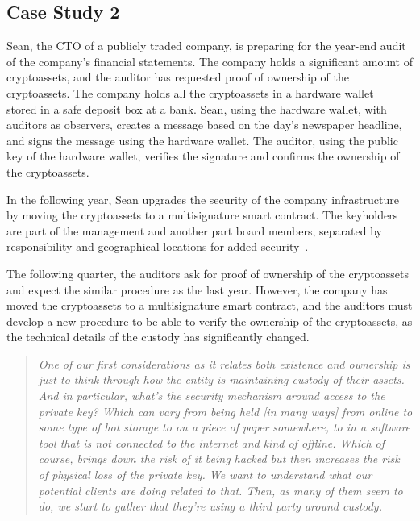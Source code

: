 \subsection{Case Study 2} \label{sec:auditing:case-studies:ownership} %
Sean, the CTO of a publicly traded company, is preparing for the year-end audit of the company's financial statements. The company holds a significant amount of cryptoassets, and the auditor has requested proof of ownership of the cryptoassets. The company holds all the cryptoassets in a hardware wallet~\cite{EBSC15} stored in a safe deposit box at a bank. Sean, using the hardware wallet, with auditors as observers, creates a message based on the day's newspaper headline, and signs the message using the hardware wallet. The auditor, using the public key of the hardware wallet, verifies the signature and confirms the ownership of the cryptoassets.

In the following year, Sean upgrades the security of the company infrastructure by moving the cryptoassets to a multisignature smart contract. The keyholders are part of the management and another part board members, separated by responsibility and geographical locations for added security~\cite{c4ccssa}. 

The following quarter, the auditors ask for proof of ownership of the cryptoassets and expect the similar procedure as the last year. However, the company has moved the cryptoassets to a multisignature smart contract, and the auditors must develop a new procedure to be able to verify the ownership of the cryptoassets, as the technical details of the custody has significantly changed.

\begin{quote}
	\textit{One of our first considerations as it relates both existence and ownership is just to think through how the entity is maintaining custody of their assets. And in particular, what's the security mechanism around access to the private key? Which can vary from being held [in many ways] from online to some type of hot storage to on a piece of paper somewhere, to in a software tool that is not connected to the internet and kind of offline. Which of course, brings down the risk of it being hacked but then increases the risk of physical loss of the private key. We want to understand what our potential clients are doing related to that. Then, as many of them seem to do, we start to gather that they're using a third party around custody.}~\cite{pimentel2021systemizing}
\end{quote}

